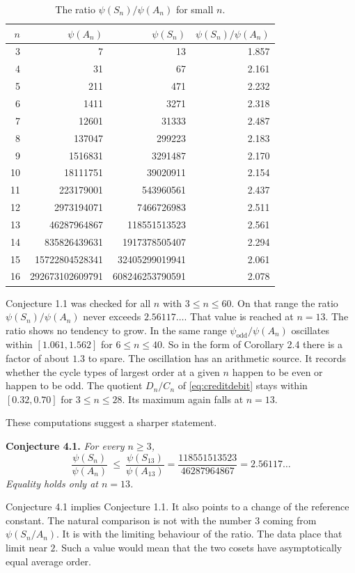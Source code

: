 \documentclass[10pt]{article}
\begin{document}
\begin{table}[ht]
\centering
\begin{tabular}{@{}rrrr@{}}
\toprule
$n$ & $\psi(A_n)$ & $\psi(S_n)$ & $\psi(S_n)/\psi(A_n)$\\
\midrule
3 & 7 & 13 & 1.857\\
4 & 31 & 67 & 2.161\\
5 & 211 & 471 & 2.232\\
6 & 1411 & 3271 & 2.318\\
7 & 12601 & 31333 & 2.487\\
8 & 137047 & 299223 & 2.183\\
9 & 1516831 & 3291487 & 2.170\\
10 & 18111751 & 39020911 & 2.154\\
11 & 223179001 & 543960561 & 2.437\\
12 & 2973194071 & 7466726983 & 2.511\\
13 & 46287964867 & 118551513523 & 2.561\\
14 & 835826439631 & 1917378505407 & 2.294\\
15 & 15722804528341 & 32405299019941 & 2.061\\
16 & 292673102609791 & 608246253790591 & 2.078\\
\bottomrule
\end{tabular}
\caption{The ratio $\psi(S_n)/\psi(A_n)$ for small $n$.}
\label{tab:ratios}
\end{table}

Conjecture 1.1 was checked for all $n$ with $3\le n\le60$. On that range the ratio
$\psi(S_n)/\psi(A_n)$ never exceeds $2.56117\ldots$. That value is reached at $n=13$. The
ratio shows no tendency to grow. In the same range $\psi_{\mathrm{odd}}/\psi(A_n)$
oscillates within $[1.061,1.562]$ for $6\le n\le40$. So in the form of Corollary 2.4 there
is a factor of about $1.3$ to spare. The oscillation has an arithmetic source. It records
whether the cycle types of largest order at a given $n$ happen to be even or happen to be
odd. The quotient $D_n/C_n$ of \eqref{eq:creditdebit} stays within $[0.32,0.70]$ for
$3\le n\le28$. Its maximum again falls at $n=13$.

These computations suggest a sharper statement.

\medskip\noindent
\textbf{Conjecture 4.1.} \emph{For every $n\ge3$,}
\[
  \frac{\psi(S_n)}{\psi(A_n)}\ \le\ \frac{\psi(S_{13})}{\psi(A_{13})}
  =\frac{118551513523}{46287964867}=2.56117\ldots
\]
\emph{Equality holds only at $n=13$.}

\medskip
Conjecture 4.1 implies Conjecture 1.1. It also points to a change of the reference constant.
The natural comparison is not with the number $3$ coming from $\psi(S_n/A_n)$. It is with
the limiting behaviour of the ratio. The data place that limit near $2$. Such a value would
mean that the two cosets have asymptotically equal average order.
\end{document}
